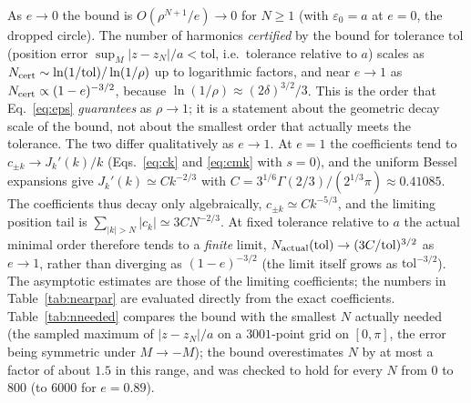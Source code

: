As $e\to0$ the bound is $O(\rho^{N+1}/e)\to0$ for $N\ge1$ (with
$\varepsilon_0=a$ at $e=0$, the dropped circle). The number of harmonics
\emph{certified} by the bound for tolerance $\mathrm{tol}$ (position error
$\sup_M|z-z_N|/a<\mathrm{tol}$, i.e.\ tolerance relative to $a$) scales as
$N_{\rm cert}\sim\ln(1/\mathrm{tol})/\ln(1/\rho)$ up to logarithmic factors, and
near $e\to1$ as $N_{\rm cert}\propto(1-e)^{-3/2}$, because
$\ln(1/\rho)\approx(2\delta)^{3/2}/3$. This is the order that Eq.~\eqref{eq:eps}
\emph{guarantees} as $\rho\to1$; it is a statement about the geometric decay
scale of the bound, not about the smallest order that actually meets the
tolerance. The two differ qualitatively as $e\to1$. At $e=1$ the coefficients
tend to $c_{\pm k}\to J_k'(k)/k$ (Eqs.~\eqref{eq:ck} and \eqref{eq:cmk} with
$s=0$), and the uniform Bessel expansions \cite{DLMF} give
$J_k'(k)\simeq C k^{-2/3}$ with
$C=3^{1/6}\Gamma(2/3)/(2^{1/3}\pi)\approx0.41085$. The coefficients thus decay
only algebraically, $c_{\pm k}\simeq Ck^{-5/3}$, and the limiting position tail
is $\sum_{|k|>N}|c_k|\simeq3CN^{-2/3}$. At fixed tolerance relative to $a$ the
actual minimal order therefore tends to a \emph{finite} limit, $N_{\rm
actual}(\mathrm{tol})\to(3C/\mathrm{tol})^{3/2}$ as $e\to1$, rather than
diverging as $(1-e)^{-3/2}$ (the limit itself grows as $\mathrm{tol}^{-3/2}$).
The asymptotic estimates are those of the limiting coefficients; the numbers in
Table~\ref{tab:nearpar} are evaluated directly from the exact coefficients.
Table~\ref{tab:nneeded} compares the bound with the smallest $N$ actually
needed (the sampled maximum of $|z-z_N|/a$ on a $3001$-point grid on $[0,\pi]$,
the error being symmetric under $M\to-M$); the bound overestimates $N$ by at
most a factor of about $1.5$ in this range, and was checked to hold for every
$N$ from $0$ to $800$ (to $6000$ for $e=0.89$).

